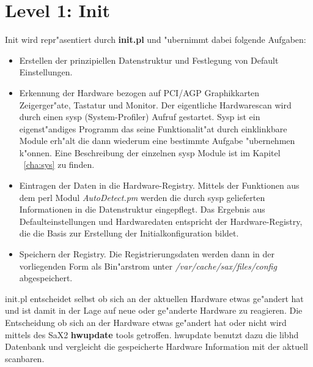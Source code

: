 \section{Level 1: Init}
\label{sec:le1}
Init wird repr"asentiert durch \textbf{init.pl} und "ubernimmt 
dabei folgende Aufgaben:\\
\begin{itemize}
\item Erstellen der prinzipiellen Datenstruktur und Festlegung
      von Default Einstellungen.
\item Erkennung der Hardware bezogen auf PCI/AGP Graphikkarten 
      Zeigerger"ate, Tastatur und Monitor. Der eigentliche 
      Hardwarescan wird durch einen sysp (System-Profiler)
      Aufruf gestartet. Sysp ist ein eigenst"andiges Programm 
      das seine Funktionalit"at durch einklinkbare Module
      erh"alt die dann wiederum eine bestimmte Aufgabe 
      "ubernehmen k"onnen. Eine Beschreibung der einzelnen sysp 
      Module ist im Kapitel ~\ref{cha:sys} zu finden.
\item Eintragen der Daten in die Hardware-Registry. Mittels der
      Funktionen aus dem perl Modul \textit{AutoDetect.pm} 
      werden die durch sysp gelieferten Informationen in die 
      Datenstruktur eingepflegt. Das Ergebnis aus Defaulteinstellungen 
      und Hardwaredaten entspricht der Hardware-Registry, die
      die Basis zur Erstellung der Initialkonfiguration bildet.
\item Speichern der Registry. Die Registrierungsdaten werden dann 
      in der vorliegenden Form als Bin"arstrom unter 
      \textit{/var/cache/sax/files/config} abgespeichert. 
\end{itemize}

init.pl entscheidet selbst ob sich an der aktuellen Hardware
etwas ge"andert hat und ist damit in der Lage auf neue oder ge"anderte
Hardware zu reagieren. Die Entscheidung ob sich an der Hardware etwas
ge"andert hat oder nicht wird mittels des SaX2 \textbf{hwupdate} tools
getroffen. hwupdate benutzt dazu die libhd Datenbank und vergleicht
die gespeicherte Hardware Information mit der aktuell scanbaren.


